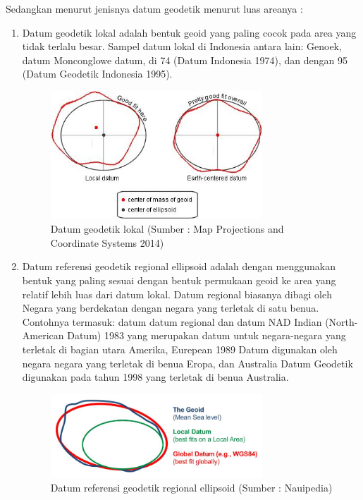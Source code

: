 Sedangkan menurut jenisnya datum geodetik menurut luas areanya :
\begin{enumerate}
\item Datum geodetik lokal adalah bentuk geoid yang paling cocok pada area yang tidak terlalu besar. Sampel datum lokal di Indonesia antara lain: Genoek, datum Monconglowe datum, di 74 (Datum Indonesia 1974), dan dengan 95 (Datum Geodetik Indonesia 1995).
\begin{figure}[htbp]
		\centering
		\includegraphics[width=0.75\textwidth]{pictures/datum_geotik_lokal.jpg}
		\caption{Datum geodetik lokal (Sumber : Map Projections and Coordinate Systems 2014)}
		\label{Datum geodetik loka}
		\end{figure}	

\item Datum referensi geodetik regional ellipsoid adalah dengan menggunakan bentuk yang paling sesuai dengan bentuk permukaan geoid ke area yang relatif lebih luas dari datum lokal. Datum regional biasanya dibagi oleh Negara yang berdekatan dengan negara yang terletak di satu benua. Contohnya termasuk: datum datum regional dan datum NAD Indian (North-American Datum) 1983 yang merupakan datum untuk negara-negara yang terletak di bagian utara Amerika, Eurepean 1989 Datum digunakan oleh negara negara yang terletak di benua Eropa, dan Australia Datum Geodetik digunakan pada tahun 1998 yang terletak di benua Australia.
\begin{figure}[htbp]
		\centering
		\includegraphics[width=0.75\textwidth]{pictures/datum_referensi_geodetik_regional_ellipsoid.jpg}
		\caption{Datum referensi geodetik regional ellipsoid (Sumber : Nauipedia)}
		\label{Datum referensi geodetik regional ellipsoid}
		\end{figure}	


\end{enumerate}
